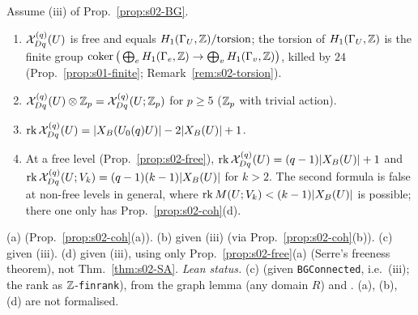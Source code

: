 \begin{proposition}\label{prop:s02-indefprops}
Assume (iii) of Prop.~\ref{prop:s02-BG}.
\begin{enumerate}[label=(\alph*)]
\item $\mathcal{X}^{(q)}_{Dq}(U)$ is free and equals $H_1(\Gamma_U,\mathbb{Z})/\mathrm{torsion}$; the torsion of $H_1(\Gamma_U,\mathbb{Z})$ is the finite group
  $\operatorname{coker}\big(\bigoplus_eH_1(\Gamma_e,\mathbb{Z})\to\bigoplus_vH_1(\Gamma_v,\mathbb{Z})\big)$, killed by $24$ (Prop.~\ref{prop:s01-finite}; Remark~\ref{rem:s02-torsion}).
\item $\mathcal{X}^{(q)}_{Dq}(U)\otimes\mathbb{Z}_p=\mathcal{X}^{(q)}_{Dq}(U;\mathbb{Z}_p)$ for $p\ge5$ ($\mathbb{Z}_p$ with trivial action).
\item $\operatorname{rk}\mathcal{X}^{(q)}_{Dq}(U)=|X_B(U_0(q)U)|-2|X_B(U)|+1$.
\item At a free level (Prop.~\ref{prop:s02-free}), $\operatorname{rk}\mathcal{X}^{(q)}_{Dq}(U)=(q-1)|X_B(U)|+1$ and
  $\operatorname{rk}\mathcal{X}^{(q)}_{Dq}(U;V_k)=(q-1)(k-1)|X_B(U)|$ for $k>2$. The second formula is false at non-free levels in general, where
  $\operatorname{rk}M(U;V_k)<(k-1)|X_B(U)|$ is possible; there one only has Prop.~\ref{prop:s02-coh}(d).
\end{enumerate}
\end{proposition}
\noindent (a) \stpmc{} (Prop.~\ref{prop:s02-coh}(a)). (b) \stpmc{} given (iii) (via Prop.~\ref{prop:s02-coh}(b)). (c) \stproved{} given (iii). (d) \stpmc{} given (iii), using only Prop.~\ref{prop:s02-free}(a) (Serre's
freeness theorem), not Thm.~\ref{thm:s02-SA}. \emph{Lean status.} (c) \stformal{} 
(given \texttt{BGConnected}, i.e.\ (iii); the rank as $\mathbb{Z}$-\texttt{finrank}), from the graph lemma
 (any domain $R$) and .
(a), (b), (d) are not formalised.
